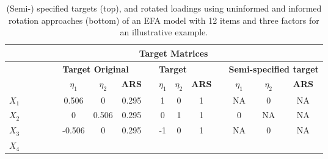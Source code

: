 \documentclass[a4paper,man,natbib]{apa6}
\begin{document}
\begin{linenumbers}

\begin{table}[]
	\centering
	\small
    \caption{(Semi-) specified targets (top), and rotated loadings using uninformed and informed rotation approaches (bottom) of an EFA model with 12 items and three factors for an illustrative example.}
	\label{tab:ExampleRot}	
	\begin{adjustbox}{width = 0.9\textwidth}
\small		
	\begin{tabular}{cccccccccccccccc}
		\hline
		&
		\multicolumn{15}{c}{\textbf{Target Matrices}} \\ \hline
		&
		&
		&
		&
		&
		\multicolumn{3}{l}{\textbf{Target Original}} &
		\textbf{} &
		\multicolumn{3}{l}{\textbf{Target}} &
		\textbf{} &
		\multicolumn{3}{l}{\textbf{Semi-specified target}} \\ \hline
		&
		&
		&
		&
		&
		\multicolumn{1}{c}{\textbf{$\eta_{1}$}} &
		\multicolumn{1}{c}{\textbf{$\eta_{2}$}} &
		\multicolumn{1}{c}{\textbf{ARS}} &
		&
		\multicolumn{1}{c}{\textbf{$\eta_{1}$}} &
		\multicolumn{1}{c}{\textbf{$\eta_{2}$}} &
		\multicolumn{1}{c}{\textbf{ARS}} &
		&
		\multicolumn{1}{c}{\textbf{$\eta_{1}$}} &
		\multicolumn{1}{c}{\textbf{$\eta_{2}$}} &
		\multicolumn{1}{c}{\textbf{ARS}} \\ \hline
		\textbf{$X_{1}$} &
		&
		&
		&
		&
		\multicolumn{1}{c}{0.506} &
		\multicolumn{1}{c}{0} &
		\multicolumn{1}{c}{0.295} &
		\multicolumn{1}{c}{} &
		\multicolumn{1}{c}{1} &
		\multicolumn{1}{c}{0} &
		\multicolumn{1}{c}{1} &
		\multicolumn{1}{c}{} &
		\multicolumn{1}{c}{NA} &
		\multicolumn{1}{c}{0} &
		\multicolumn{1}{c}{NA} \\ \hline
		\textbf{$X_{2}$} &
		&
		&
		&
		&
		\multicolumn{1}{c}{0} &
		\multicolumn{1}{c}{0.506} &
		\multicolumn{1}{c}{0.295} &
		\multicolumn{1}{c}{} &
		\multicolumn{1}{c}{0} &
		\multicolumn{1}{c}{1} &
		\multicolumn{1}{c}{1} &
		\multicolumn{1}{c}{} &
		\multicolumn{1}{c}{0} &
		\multicolumn{1}{c}{NA} &
		\multicolumn{1}{c}{NA} \\ \hline
		\textbf{$X_{3}$} &
		&
		&
		&
		&
		\multicolumn{1}{c}{-0.506} &
		\multicolumn{1}{c}{0} &
		\multicolumn{1}{c}{0.295} &
		\multicolumn{1}{c}{} &
		\multicolumn{1}{c}{-1} &
		\multicolumn{1}{c}{0} &
		\multicolumn{1}{c}{1} &
		\multicolumn{1}{c}{} &
		\multicolumn{1}{c}{NA} &
		\multicolumn{1}{c}{0} &
		\multicolumn{1}{c}{NA} \\ \hline
		\textbf{$X_{4}$} &
		&

\end{tabular}
\end{adjustbox}
\end{table}
\end{linenumbers}
\end{document}

